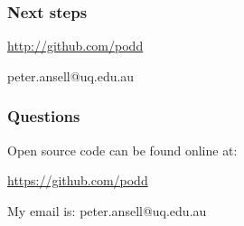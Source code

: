 \documentclass[12pt]{beamer}
\begin{document}
\begin{frame}
\frametitle{Next steps}

\end{frame}


\begin{frame}

\url{http://github.com/podd}

peter.ansell@uq.edu.au

\end{frame}






\begin{frame}
\frametitle{Questions}

Open source code can be found online at:

\url{https://github.com/podd}

My email is: peter.ansell@uq.edu.au

\end{frame}
\end{document}
